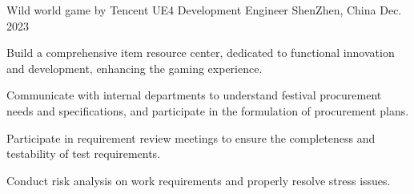 

\begin{cventries}

  \cventry
    {Wild world game by Tencent} %
    {UE4 Development Engineer} %
    {ShenZhen, China} %
    {Dec. 2023} %
    {
      \begin{cvitems} %
          \item {Build a comprehensive item resource center, dedicated to functional innovation and development, enhancing the gaming experience.}
        \item {Communicate with internal departments to understand festival procurement needs and specifications, and participate in the formulation of procurement plans.}
        \item {Participate in requirement review meetings to ensure the completeness and testability of test requirements.}
        \item {Conduct risk analysis on work requirements and properly resolve stress issues.}
      \end{cvitems}
    }

\end{cventries}
